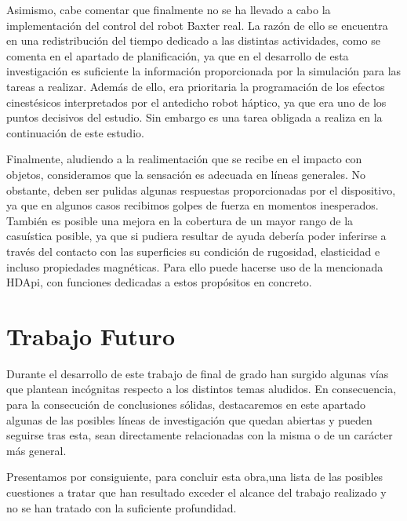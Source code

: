 Asimismo, cabe comentar que finalmente no se ha llevado a cabo la implementación del control del robot Baxter real. La razón de ello se encuentra en una redistribución del tiempo dedicado a las distintas actividades, como se comenta en el apartado de planificación, ya que en el desarrollo de esta investigación es suficiente la información proporcionada por la simulación para las tareas a realizar. Además de ello, era prioritaria la programación de los efectos cinestésicos interpretados por el antedicho robot háptico, ya que era uno de los puntos decisivos del estudio. Sin embargo es una tarea obligada a realiza en la continuación de este estudio.

Finalmente, aludiendo a la realimentación que se recibe en el impacto con objetos, consideramos que la sensación es adecuada en líneas generales. No obstante, deben ser pulidas algunas respuestas proporcionadas por el dispositivo, ya que en algunos casos recibimos golpes de fuerza en momentos inesperados. También es posible una mejora en la cobertura de un mayor rango de la casuística posible, ya que si pudiera resultar de ayuda debería poder inferirse a través del contacto con las superficies su condición de rugosidad, elasticidad e incluso propiedades magnéticas. Para ello puede hacerse uso de la mencionada HDApi, con funciones dedicadas a estos propósitos en concreto. 

\section{Trabajo Futuro}
 Durante el desarrollo de este trabajo de final de grado han surgido algunas vías que plantean incógnitas respecto a los distintos temas aludidos. En consecuencia, para la consecución de conclusiones sólidas, destacaremos en este apartado algunas de las posibles líneas de investigación que quedan abiertas y pueden seguirse tras esta, sean directamente relacionadas con la misma o de un carácter más general.
 
 Presentamos por consiguiente, para concluir esta obra,una lista de las posibles cuestiones a tratar que han resultado exceder el alcance del trabajo realizado y no se han tratado con la suficiente profundidad.
 

